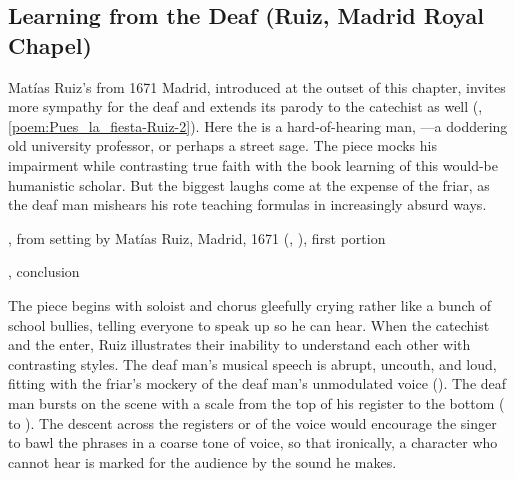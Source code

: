 
\subsection{Learning from the Deaf (Ruiz, Madrid Royal Chapel)}

Matías Ruiz's  from 1671 Madrid, introduced
at the outset of this chapter, invites more sympathy for the deaf and extends
its parody to the catechist as well (,
\ref{poem:Pues_la_fiesta-Ruiz-2}).
Here the  is a hard-of-hearing man, ---a doddering old university professor, or perhaps a street
sage.
The piece mocks his impairment while contrasting true faith with the book
learning of this would-be humanistic scholar.
But the biggest laughs come at the expense of the friar, as the deaf man
mishears his rote teaching formulas in increasingly absurd ways.


\begin{poemexample}
    \caption{,
    from setting by Matías Ruiz, Madrid, 1671 (,
    ), first portion}
    \label{poem:Pues_la_fiesta-Ruiz-1}
\end{poemexample}

\begin{poemexample}
    \caption{,
    conclusion} 
    \label{poem:Pues_la_fiesta-Ruiz-2}
\end{poemexample}

The piece begins with soloist and chorus gleefully crying  rather like a bunch of school bullies, telling everyone to speak
up so he can hear.
When the catechist and the  enter, Ruiz illustrates their inability
to understand each other with contrasting styles.
The deaf man's musical speech is abrupt, uncouth, and loud, fitting with the
friar's mockery of the deaf man's unmodulated voice
().
The deaf man bursts on the scene with a scale from the top of his register to
the bottom ( to ).
The descent across the registers or  of the voice would encourage
the singer to bawl the phrases in a coarse tone of voice, so that ironically, a
character who cannot hear is marked for the audience by the sound he makes.

